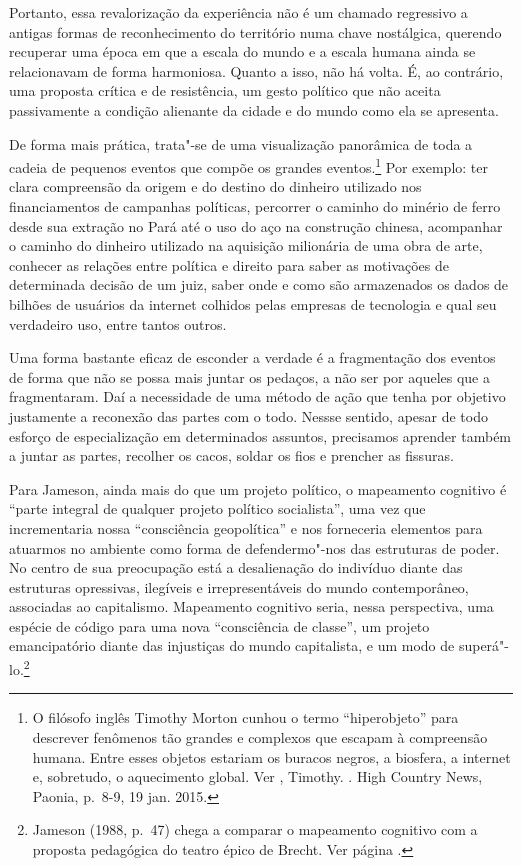 Portanto, essa revalorização da experiência não é um chamado regressivo
a antigas formas de reconhecimento do território numa chave nostálgica,
querendo recuperar uma época em que a escala do mundo e a escala humana
ainda se relacionavam de forma harmoniosa. Quanto a isso, não há volta.
É, ao contrário, uma proposta crítica e de resistência, um gesto
político que não aceita passivamente a condição alienante da cidade e do
mundo como ela se apresenta.

De forma mais prática, trata"-se de uma visualização panorâmica de toda a cadeia de pequenos eventos que compõe os grandes eventos.\footnote{O filósofo inglês Timothy Morton cunhou o termo ``hiperobjeto'' para descrever fenômenos tão grandes e complexos que escapam à compreensão humana. Entre esses objetos estariam os buracos negros, a biosfera, a internet e, sobretudo, o aquecimento global. Ver , Timothy. {}. High Country News, Paonia, p.~8-9, 19 jan. 2015.} Por exemplo: ter clara compreensão da origem e do destino do dinheiro utilizado nos financiamentos de campanhas políticas, percorrer o caminho do minério de ferro desde sua extração no Pará até o uso do aço na construção chinesa, acompanhar o caminho do dinheiro utilizado na aquisição milionária de uma obra de arte, conhecer as relações entre política e direito para saber as motivações de determinada decisão de um juiz, saber onde e como são armazenados os dados de bilhões de usuários da internet colhidos pelas empresas de tecnologia e qual seu verdadeiro uso, entre tantos outros.

Uma forma bastante eficaz de esconder a verdade é a fragmentação dos eventos de forma que não se possa mais juntar os pedaços, a não ser por aqueles que a fragmentaram. Daí a necessidade de uma método de ação que tenha por objetivo justamente a reconexão das partes com o todo. Nessse sentido, apesar de todo esforço de especialização em determinados assuntos, precisamos aprender também a juntar as partes, recolher os cacos, soldar os fios e prencher as fissuras.

Para Jameson, ainda mais do que um projeto político, o mapeamento
cognitivo é ``parte integral de qualquer projeto político socialista'',
uma vez que incrementaria nossa ``consciência geopolítica'' e nos
forneceria elementos para atuarmos no ambiente como forma de
defendermo"-nos das estruturas de poder. No centro de sua preocupação
está a desalienação do indivíduo diante das estruturas opressivas,
ilegíveis e irrepresentáveis do mundo contemporâneo, associadas ao
capitalismo. Mapeamento cognitivo seria, nessa perspectiva, uma espécie
de código para uma nova ``consciência de classe'', um projeto
emancipatório diante das injustiças do mundo capitalista, e um modo de
superá"-lo.\footnote{Jameson (1988, p.~47) chega a comparar o mapeamento cognitivo com a proposta pedagógica do teatro épico de Brecht. Ver página \pageref{verfremdungseffekt}.}

